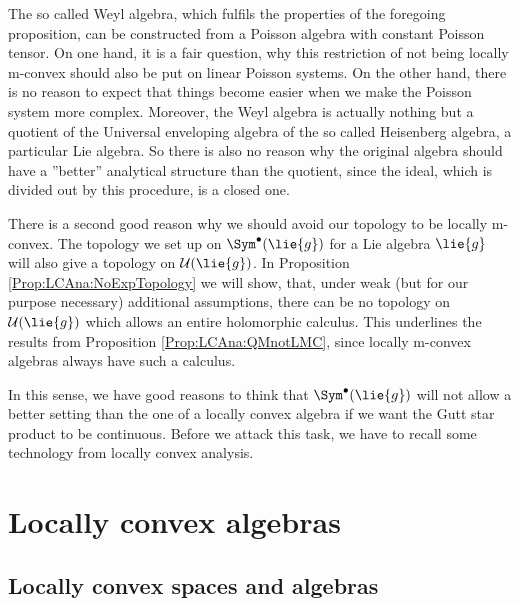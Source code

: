 \begin{remark}
	The so called Weyl algebra, which fulfils the properties of the 
	foregoing proposition, can be constructed from a Poisson algebra with 
	constant Poisson tensor. On one hand, it is a fair question, why this 
	restriction of not being locally m-convex should also be put on 
	linear Poisson systems. On the other hand, there is no reason to 
	expect that things become easier when we make the Poisson system more 
	complex. Moreover, the Weyl algebra is actually nothing but a 
	quotient of the Universal enveloping algebra of the so called 
	Heisenberg algebra, a particular Lie algebra. So there is also no 
	reason why the original algebra should have a ''better'' analytical 
	structure than the quotient, since the ideal, which is divided out by 
	this procedure, is a closed one.
\end{remark}
There is a second good reason why we should avoid our topology to be locally 
m-convex. The topology we set up on $\Sym^{\bullet}(\lie{g})$ for a Lie 
algebra $\lie{g}$ will also give a topology on $\mathcal{U}(\lie{g})$.
In Proposition \ref{Prop:LCAna:NoExpTopology} we will show, that, under weak 
(but for our purpose necessary) additional assumptions, there can be no 
topology on $\mathcal{U}(\lie{g})$ which allows an entire holomorphic 
calculus. This underlines the results from Proposition 
\ref{Prop:LCAna:QMnotLMC}, since locally m-convex algebras always have such a 
calculus.


In this sense, we have good reasons to think that 
$\Sym^{\bullet}(\lie{g})$ will not allow a better setting than the
one of a locally convex algebra if we want the Gutt star product to 
be continuous. Before we attack this task, we have to recall some
technology from locally convex analysis.



\section{Locally convex algebras}
\label{sec:chap5_LCAlg}

\subsection{Locally convex spaces and algebras}

